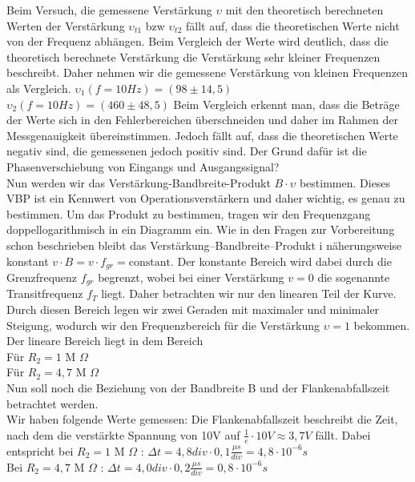 Beim Versuch, die gemessene Verstärkung $\upsilon$ mit den theoretisch berechneten Werten der Verstärkung  $\upsilon_{t1}$ bzw $\upsilon_{t2}$ fällt auf, dass die theoretischen Werte nicht von der Frequenz abhängen. Beim Vergleich der Werte wird deutlich, dass die theoretisch berechnete Verstärkung die Verstärkung sehr kleiner Frequenzen beschreibt. Daher nehmen wir die gemessene Verstärkung von kleinen Frequenzen als Vergleich. 
$\upsilon_1(f=10Hz)=(98\pm 14,5)$\\
$\upsilon_2(f=10Hz)=(460\pm 48,5)$
Beim Vergleich erkennt man, dass die Beträge der Werte sich in den Fehlerbereichen überschneiden und daher im Rahmen der Messgenauigkeit übereinstimmen. Jedoch fällt auf, dass die theoretischen Werte negativ sind, die gemessenen jedoch positiv sind. Der Grund dafür ist die Phasenverschiebung von Eingangs und Ausgangssignal? \\

Nun werden wir das Verstärkung-Bandbreite-Produkt $B\cdot \upsilon$ bestimmen. Dieses VBP ist ein Kennwert von Operationsverstärkern und daher wichtig, es genau zu bestimmen.  Um das Produkt zu bestimmen, tragen wir den Frequenzgang doppellogarithmisch in ein Diagramm ein. Wie in den Fragen zur Vorbereitung schon beschrieben bleibt das Verstärkung–Bandbreite–Produkt i näherungsweise konstant $v\cdot B = v \cdot f_{gr} = \text{constant}$. Der konstante Bereich wird dabei durch die Grenzfrequenz $f_{gr}$ begrenzt, wobei bei einer Verstärkung $v=0$ die sogenannte Transitfrequenz $f_T$ liegt. Daher betrachten wir nur den linearen Teil der Kurve. Durch diesen Bereich legen wir zwei Geraden mit maximaler und minimaler Steigung, wodurch wir den Frequenzbereich für die Verstärkung $\upsilon=1$ bekommen. 
Der lineare Bereich liegt in dem Bereich\\
Für $R_2=1$ M $\Omega$\\
Für $R_2=4,7$ M $\Omega$ \\


Nun soll noch die Beziehung von der Bandbreite B und der Flankenabfallszeit betrachtet werden.\\
Wir haben folgende Werte gemessen:
Die Flankenabfallszeit beschreibt die Zeit, nach dem die verstärkte Spannung von 10V auf $\frac{1}{e} \cdot 10V \approx 3,7V$ fällt. Dabei entspricht bei $R_2=1$ M $\Omega$ : $\Delta t =4,8div \cdot 0,1\frac{\mu s}{div}=4,8\cdot10^{-6}s$\\
Bei $R_2=4,7$ M $\Omega$ : $\Delta t =4,0div \cdot 0,2\frac{\mu s}{div}=0,8\cdot10^{-6}s$ 














